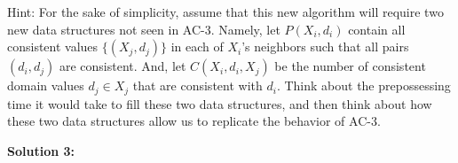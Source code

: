 \documentclass[]{article}
\begin{document}
Hint: For the sake of simplicity, assume that this new algorithm will require two new data structures not seen in AC-3.  Namely, let $P(X_i, d_i)$ contain all consistent values $\{(X_j, d_j)\}$ in each of $X_i$'s neighbors such that all pairs $(d_i, d_j)$ are consistent.  And, let $C(X_i, d_i, X_j)$ be the number of consistent domain values $d_j \in X_j$ that are consistent with $d_i$.  Think about the prepossessing time it would take to fill these two data structures, and then think about how these two data structures allow us to replicate the behavior of AC-3.

\bigskip

\textbf{Solution 3:}
\end{document}
